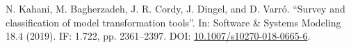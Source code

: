 \begin{yearlist}
\item[\cite{sosym2019-mt}]
N. Kahani, M. Bagherzadeh, J. R. Cordy, J. Dingel, and D. Varró. “Survey and classification of model transformation tools”. In: Software \& Systems Modeling 18.4 (2019). IF: 1.722, pp. 2361–2397. 
\newline DOI: \href{https://doi.org/10.1007/s10270-018-0665-6}{10.1007/s10270-018-0665-6}.

\end{yearlist}